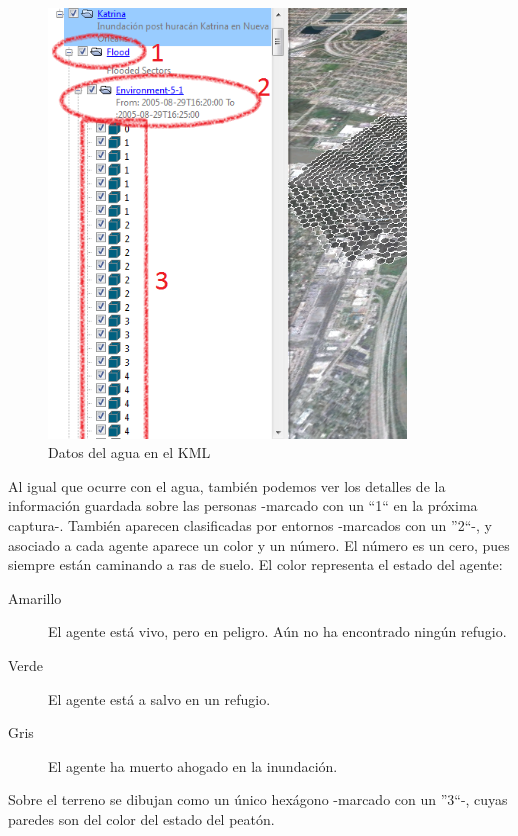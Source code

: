 \begin{figure}[H]
 \centering
 \includegraphics[width=95mm]{figuras/cap6/resultados/flood_data.png}
 \caption{Datos del agua en el KML}
\end{figure}

Al igual que ocurre con el agua, también podemos ver los detalles de la
información guardada sobre las personas -marcado con un ``1`` en la próxima
captura-. También aparecen clasificadas por entornos -marcados con un ''2``-, y
asociado a cada agente aparece un color y un número. El número es un cero, pues
siempre están caminando a ras de suelo. El color representa el estado del
agente:

\begin{description}
 \item[Amarillo] El agente está vivo, pero en peligro. Aún no ha encontrado
 ningún refugio.
 \item[Verde] El agente está a salvo en un refugio.
 \item[Gris] El agente ha muerto ahogado en la inundación.
\end{description}

Sobre el terreno se dibujan como un único hexágono -marcado con un ''3``-,
cuyas paredes son del color del estado del peatón.

